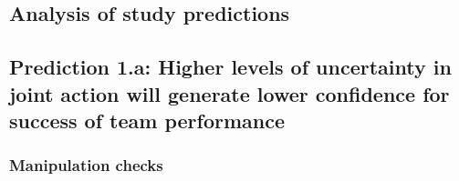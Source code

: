 \begin{CJK}{UTF8}{gbsn}



















\section{Analysis of study predictions\label{sect:resultsStudyPredictions}}


\subsection{Prediction 1.a: Higher levels of uncertainty in joint action will generate lower confidence for success of team performance}

\subsubsection{Manipulation checks}


\end{CJK}
